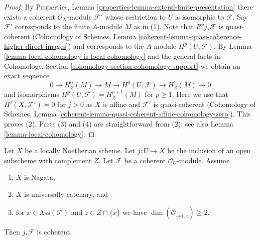 \begin{proof}
By Properties, Lemma \ref{properties-lemma-extend-finite-presentation}
there exists a coherent $\mathcal{O}_X$-module $\mathcal{F}'$
whose restriction to $U$ is isomorphic to $\mathcal{F}$.
Say $\mathcal{F}'$ corresponds to the finite $A$-module $M$
as in (1).
Note that $R^pj_*\mathcal{F}$ is quasi-coherent
(Cohomology of Schemes, Lemma
\ref{coherent-lemma-quasi-coherence-higher-direct-images})
and corresponds to the $A$-module $H^p(U, \mathcal{F})$.
By Lemma \ref{lemma-local-cohomology-is-local-cohomology}
and the general facts in
Cohomology, Section \ref{cohomology-section-cohomology-support}
we obtain an exact sequence
$$
0 \to H^0_Z(M) \to M \to H^0(U, \mathcal{F}) \to H^1_Z(M) \to 0
$$
and isomorphisms $H^p(U, \mathcal{F}) = H^{p + 1}_Z(M)$ for $p \geq 1$.
Here we use that $H^j(X, \mathcal{F}') = 0$ for $j > 0$ as $X$ is affine
and $\mathcal{F}'$ is quasi-coherent (Cohomology of Schemes,
Lemma \ref{coherent-lemma-quasi-coherent-affine-cohomology-zero}).
This proves (2).
Parts (3) and (4) are straightforward from (2); see also
Lemma \ref{lemma-local-cohomology}.
\end{proof}

\begin{lemma}
\label{lemma-finiteness-pushforward}
Let $X$ be a locally Noetherian scheme.
Let $j : U \to X$ be the inclusion of an
open subscheme with complement $Z$. Let $\mathcal{F}$ be a coherent
$\mathcal{O}_U$-module. Assume
\begin{enumerate}
\item $X$ is Nagata,
\item $X$ is universally catenary, and
\item for $x \in \text{Ass}(\mathcal{F})$ and
$z \in Z \cap \overline{\{x\}}$ we have
$\dim(\mathcal{O}_{\overline{\{x\}}, z}) \geq 2$.
\end{enumerate}
Then $j_*\mathcal{F}$ is coherent.
\end{lemma}

